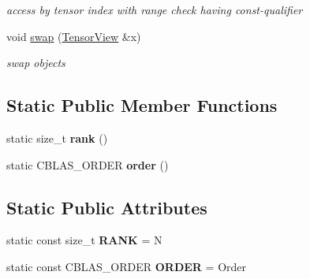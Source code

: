 \begin{DoxyCompactItemize}
\begin{DoxyCompactList}\small\item\em access by tensor index with range check having const-\/qualifier \item\end{DoxyCompactList}\item 
\hypertarget{classbtas_1_1_tensor_view_ab26c48361e58a553950fc99e7e18954e}{
void \hyperlink{classbtas_1_1_tensor_view_ab26c48361e58a553950fc99e7e18954e}{swap} (\hyperlink{classbtas_1_1_tensor_view}{TensorView} \&x)}
\label{classbtas_1_1_tensor_view_ab26c48361e58a553950fc99e7e18954e}

\begin{DoxyCompactList}\small\item\em swap objects \item\end{DoxyCompactList}\end{DoxyCompactItemize}
\subsection*{Static Public Member Functions}
\begin{DoxyCompactItemize}
\item 
\hypertarget{classbtas_1_1_tensor_view_ae049fa81f9cbf5841b27b4bc8a2f6374}{
static size\_\-t {\bfseries rank} ()}
\label{classbtas_1_1_tensor_view_ae049fa81f9cbf5841b27b4bc8a2f6374}

\item 
\hypertarget{classbtas_1_1_tensor_view_aed39ee9b885ef561d37d00ed8bd1470d}{
static CBLAS\_\-ORDER {\bfseries order} ()}
\label{classbtas_1_1_tensor_view_aed39ee9b885ef561d37d00ed8bd1470d}

\end{DoxyCompactItemize}
\subsection*{Static Public Attributes}
\begin{DoxyCompactItemize}
\item 
\hypertarget{classbtas_1_1_tensor_view_a60117eccb1d31f5cdb82b107fc5584d4}{
static const size\_\-t {\bfseries RANK} = N}
\label{classbtas_1_1_tensor_view_a60117eccb1d31f5cdb82b107fc5584d4}

\item 
\hypertarget{classbtas_1_1_tensor_view_ac2de4e1a723284ee9793162fc23df246}{
static const CBLAS\_\-ORDER {\bfseries ORDER} = Order}
\label{classbtas_1_1_tensor_view_ac2de4e1a723284ee9793162fc23df246}

\end{DoxyCompactItemize}


